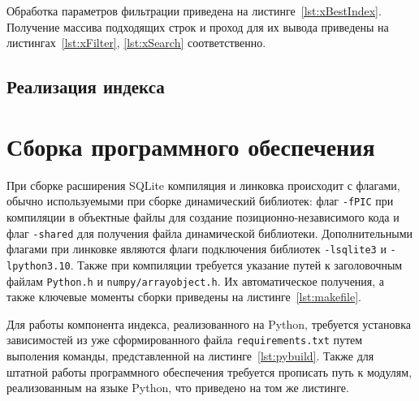 {
\captionsetup{format=hang,justification=raggedright,
              singlelinecheck=off,width=16cm}
}

Обработка параметров фильтрации приведена на листинге~\ref{lst:xBestIndex}.
Получение массива подходящих строк и проход для их вывода приведены на
листингах~\ref{lst:xFilter}, \ref{lst:xSearch} соответственно.

{
\captionsetup{format=hang,justification=raggedright,
              singlelinecheck=off,width=16cm}
}

{
\captionsetup{format=hang,justification=raggedright,
              singlelinecheck=off,width=16cm}
}

{
\captionsetup{format=hang,justification=raggedright,
              singlelinecheck=off,width=16cm}
}

\subsection{Реализация индекса}

\section{Сборка программного обеспечения}

При сборке расширения SQLite компиляция и линковка происходит с флагами,
обычно используемыми при сборке динамический библиотек: флаг \texttt{-fPIC} при
компиляции в объектные файлы для создание позиционно-независимого кода и флаг
\texttt{-shared} для получения файла динамической библиотеки. Дополнительными
флагами при линковке являются флаги подключения библиотек \texttt{-lsqlite3} и
\texttt{-lpython3.10}. Также при компиляции требуется указание путей к
заголовочным файлам \texttt{Python.h} и \texttt{numpy/arrayobject.h}. Их
автоматическое получения, а также ключевые моменты сборки приведены на
листинге~\ref{lst:makefile}.

{
\captionsetup{format=hang,justification=raggedright,
              singlelinecheck=off,width=16cm}
}

Для работы компонента индекса, реализованного на Python, требуется установка
зависимостей из уже сформированного файла \texttt{requirements.txt} путем
выполения команды, представленной на листинге~\ref{lst:pybuild}. Также для
штатной работы программного обеспечения требуется прописать путь к модулям,
реализованным на языке Python, что приведено на том же листинге.

